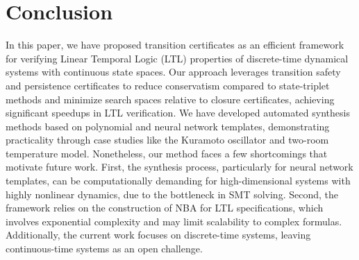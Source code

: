 \section{Conclusion}
\label{sec:conclusion}

In this paper, we have proposed transition certificates as an efficient framework for verifying Linear Temporal Logic (LTL) properties of discrete-time dynamical systems with continuous state spaces. Our approach leverages transition safety and persistence certificates to reduce conservatism compared to state-triplet methods and minimize search spaces relative to closure certificates, achieving significant speedups in LTL verification. We have developed automated synthesis methods based on polynomial and neural network templates, demonstrating practicality through case studies like the Kuramoto oscillator and two-room temperature model. Nonetheless, our method faces a few shortcomings that motivate future work. First, the synthesis process, particularly for neural network templates, can be computationally demanding for high-dimensional systems with highly nonlinear dynamics, due to the bottleneck in SMT solving. Second, the framework relies on the construction of NBA for LTL specifications, which involves exponential complexity and may limit scalability to complex formulas. Additionally, the current work focuses on discrete-time systems, leaving continuous-time systems as an open challenge.